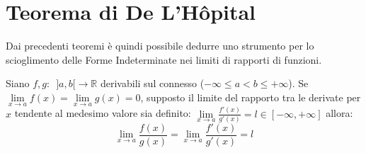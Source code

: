 \documentclass[10pt, oneside]{book}
\theoremstyle{plain}
\begin{document}
\section{Teorema di De L'H\^opital}
Dai precedenti teoremi è quindi possibile dedurre uno strumento per lo scioglimento delle Forme Indeterminate nei limiti di rapporti di funzioni.
\begin{ther}[\textbf{T. di De L'H.}]
Siano $f,g : \enspace ]a, b[ \rightarrow \mathbb{R}$ derivabili sul connesso ($- \infty \leq a < b \leq + \infty$). Se $\lim \limits_{x \rightarrow a} f(x) = \lim \limits_{x \rightarrow a} g(x) = 0$, supposto il limite del rapporto tra le derivate per $x$ tendente al medesimo valore sia definito: $\lim \limits_{x \rightarrow a} \frac{f'(x)}{g'(x)} = l \in [- \infty, + \infty]$ allora:
\[\lim \limits_{x \rightarrow a} \frac{f(x)}{g(x)} = \lim \limits_{x \rightarrow a} \frac{f'(x)}{g'(x)} = l\]
\end{ther}
\end{document}
